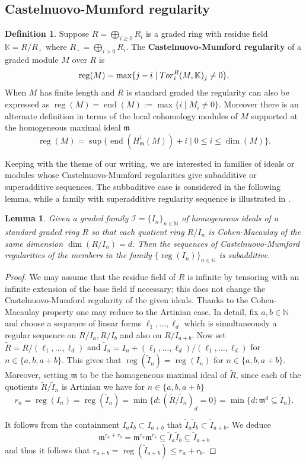 \documentclass[12pt, reqno]{amsart}
\numberwithin{equation}{section}
\newcommand{\fm}{{\mathfrak m}}
\newcommand{\N}{{\mathbb N}}
\newcommand{\kk}{\mathbb{K}}
\DeclareMathOperator{\reg}{reg}
\DeclareMathOperator{\soc}{end}
\theoremstyle{plain} %
\newtheorem{lem}[thm]{Lemma}
\theoremstyle{definition}
\newtheorem{defn}[thm]{Definition}
\theoremstyle{remark}
\begin{document}
\subsection{Castelnuovo-Mumford regularity}
\begin{defn}
\label{def:reg}
Suppose $R=\bigoplus_{i\ge 0} R_i$ is a graded ring with residue field $\kk=R/R_{+}$ where $R_{+}=\bigoplus_{i>0} R_i$.
The {\bf Castelnuovo-Mumford  regularity} of a graded module $M$ over $R$ is
\[
\reg(M)=\max\{j-i \mid {\rm Tor}^R_i(M,\kk)_j\neq 0\}.
\]
 When $M$ has finite length and $R$ is standard graded the regularity  can also be expressed as $\reg(M)=\soc(M):=\max\{i \mid M_i\neq 0\}$. Moreover there is an alternate definition in terms of the local cohomology modules of $M$ supported at the homogeneous maximal ideal $\fm$
 \[
\reg(M)=\sup\{\soc\left(H^i_\fm(M)\right)+i \mid 0\leq i\leq \dim(M)\}.
\]
\end{defn}

Keeping with the theme of our writing, we are interested in families of ideals or modules whose Castelnuovo-Mumford regularities give subadditive or superadditive sequences. The subbaditive case is considered in the following lemma, while a family with superadditive regularity sequence is illustrated in .
\begin{lem}
\label{lem:CM}
Given a graded family $\mathcal{I}=\{I_n\}_{n\in \N}$ of homogeneous ideals of a standard graded ring $R$ so that each quotient ring $R/I_n$ is Cohen-Macaulay of the same dimension $\dim(R/I_n)=d$. Then the sequences of Castelnuovo-Mumford regularities of the members in the family
$
\{\reg(I_n)\}_{n\in \N}
$
is subadditive.
\end{lem}
\begin{proof}
We may assume that the residue field of $R$ is infinite by tensoring with an infinite extension of the base field if necessary; this does not change the Castelnuovo-Mumford regularity of the given ideals. Thanks to the Cohen-Macaulay property one may reduce to the Artinian case. In detail, fix $a,b\in \N$ and choose a sequence of linear forms $\ell_1, \ldots, \ell_{d}$ which is simultaneously a regular sequence on $R/I_a, R/I_b$ and also on $R/I_{a+b}$. Now set $\widetilde{R}=R/(\ell_1, \ldots, \ell_d)$ and $\widetilde{I}_n=I_n+(\ell_1, \ldots, \ell_d)/(\ell_1, \ldots, \ell_d)$ for $n\in\{a,b,a+b\}$. This gives that $\reg(\widetilde{I}_n)=\reg(I_n)$ for $n\in\{a,b,a+b\}$. Moreover, setting $\fm$ to be the homogeneous maximal ideal of $\widetilde{R}$, since each of the quotients $\widetilde{R}/\widetilde{I}_n$ is Artinian we have for $n\in\{a,b,a+b\}$
\[
r_n=\reg(I_n)=\reg\left(\widetilde{I}_n\right)=\min\{d: \left(\widetilde{R}/\widetilde{I}_n\right)_d=0\}=\min\{d: \fm^d\subseteq \widetilde{I}_n\}.
\]

It follows from the containment $I_aI_b\subset I_{a+b}$  that $\widetilde{I}_a\widetilde{I}_b\subset \widetilde{I}_{a+b}$. 
We deduce
\[
\fm^{r_a+r_b}=\fm^{r_a}\fm^{r_b}\subseteq \widetilde{I}_a\widetilde{I}_b\subseteq \widetilde{I}_{a+b}
\]
and thus it follows that $r_{a+b}=\reg\left(\widetilde{I}_{a+b}\right)\leq r_a+r_b$.
\end{proof}
\end{document}
